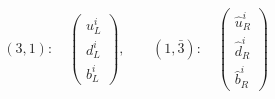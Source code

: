 \begin{equation}
(3,1): \quad \left( \begin{array}{c}
u_L^i \\ d_L^i \\ b_L^i
\end{array} \right), ~~~~\quad (1,\bar{3}):\quad
\left( \begin{array}{c}
\hat{u}_R^i \\ \hat{d}_R^i \\ \hat{b}_R^i
\end{array} \right)
\end{equation}


